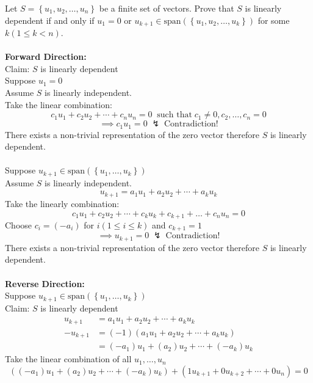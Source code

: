 Let $S = \left\{u_1,u_2,\dots,u_n\right\}$ be a finite set of
vectors. Prove that $S$ is linearly dependent if and only if $u_1 =0$
or $u_{k+1} \in
\text{span}\left(\left\{u_1,u_2,\dots,u_k\right\}\right)$ for some $k
\left(1 \leq k < n\right)$.
\\\hfill\\
\textbf{Forward Direction:}\\
Claim: $S$ is linearly dependent 
\\Suppose $u_1=0$
\\Assume $S$ is linearly independent.
\\Take the linear combination:
\begin{equation}
c_1u_1 + c_2u_2 + \cdots + c_nu_n =0 \; \;\text{such that}\; c_1 \neq 0,
c_2,\dots,c_n = 0
\end{equation}
\begin{equation}
\implies c_1u_1 = 0 \;\lightning\; \text{Contradiction!}
\end{equation}
There exists a non-trivial representation of the zero vector therefore
$S$ is linearly dependent.\\\hfill
\\Suppose $u_{k+1} \in \text{span}(\left\{u_1,\dots,u_k\right\})$ 
\\Assume $S$ is linearly independent.
\begin{equation}
u_{k+1} = a_1u_1 + a_2u_2 + \cdots + a_ku_k
\end{equation}
Take the linearly combination:
\begin{equation}
c_1u_1 + c_2u_2 + \cdots + c_ku_k + c_{k+1} + \dots + c_nu_n = 0
\end{equation}
Choose $c_i = (-a_i)$ for $i(1\leq i \leq k)$ and $c_{k+1}=1$
\begin{equation}
\implies u_{k+1} = 0 \;\lightning\; \text{Contradiction!}
\end{equation}
There exists a non-trivial representation of the zero vector therefore
$S$ is linearly dependent.\\\hfill\\
\textbf{Reverse Direction:}\\
Suppose $u_{k+1} \in \text{span}(\left\{u_1,\dots,u_k\right\})$
\\Claim: $S$ is linearly dependent 
\begin{align}
u_{k+1}  &= a_1u_1 + a_2u_2 + \cdots + a_ku_k\\
-u_{k+1} &= \left(-1\right)\left(a_1u_1 + a_2u_2 + \cdots +
  a_ku_k\right)\\
&= \left(-a_1\right)u_1 + \left(a_2\right)u_2 + \cdots + \left(-a_k\right)u_k
\end{align}
Take the linear combination of all $u_1,\dots,u_n$
\begin{equation}
\left(\left(-a_1\right)u_1 + \left(a_2\right)u_2 + \cdots +
  \left(-a_k\right)u_k\right) + \left(1u_{k+1} + 0u_{k+2}
  + \cdots + 0u_n\right)=0
\end{equation}

